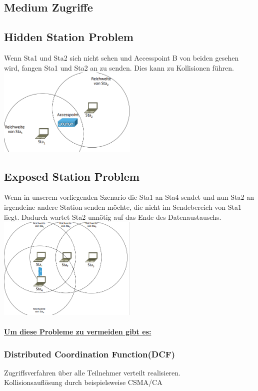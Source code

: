 \documentclass[12pt,a4paper]{article}
\begin{document}
	\subsection{Medium Zugriffe}
		\subsection{Hidden Station Problem}
			Wenn Sta1 und Sta2 sich nicht sehen und Accesspoint B von beiden gesehen wird, fangen Sta1 und Sta2 an zu senden. Dies kann zu Kollisionen führen.\\
			\includegraphics[width=0.5\textwidth]{Bilder/hidden_station_problem.PNG}

		\subsection{Exposed Station Problem}
			Wenn in unserem vorliegenden Szenario die Sta1 an Sta4 sendet und nun Sta2 an irgendeine andere Station senden möchte, die nicht im Sendebereich von Sta1 liegt. Dadurch wartet Sta2 unnötig auf das Ende des Datenaustauschs.\\
			\includegraphics[width=0.5\textwidth]{Bilder/exposed_station_problem.PNG}\\
			\vspace{2cm}\\
			\textbf{\underline{Um diese Probleme zu vermeiden gibt es:}}

		\subsubsection*{Distributed Coordination Function(DCF)}
			Zugriffsverfahren über alle Teilnehmer verteilt realisieren.\\
			Kollisionsauflösung durch beispielsweise CSMA/CA
\end{document}
